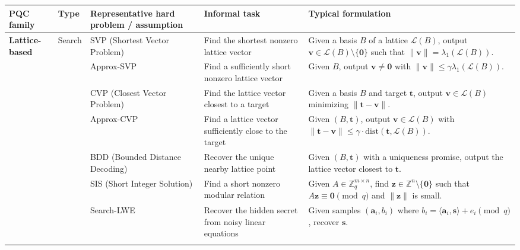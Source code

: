 \documentclass[11pt]{article}
\begin{document}
	\begin{center}
		\scriptsize
		\renewcommand{\arraystretch}{1.35}
		\setlength{\tabcolsep}{4pt}
		\begin{tabular}{|p{2.1cm}|p{1.8cm}|p{3.3cm}|p{3.8cm}|p{4.9cm}|}
			\hline
			\textbf{PQC family} & \textbf{Type} & \textbf{Representative hard problem / assumption} & \textbf{Informal task} & \textbf{Typical formulation} \\
			\hline
			
			\multirow{12}{=}{\textbf{Lattice-based}}
			& \multirow{7}{=}{Search}
			& SVP (Shortest Vector Problem)
			& Find the shortest nonzero lattice vector
			& Given a basis $B$ of a lattice $\mathcal{L}(B)$, output $\bm v \in \mathcal{L}(B)\setminus\{\bm 0\}$ such that $\|\bm v\|=\lambda_1(\mathcal{L}(B))$. \\
			\cline{3-5}
			
			& & Approx-SVP
			& Find a sufficiently short nonzero lattice vector
			& Given $B$, output $\bm v \neq \bm 0$ with $\|\bm v\| \le \gamma \lambda_1(\mathcal{L}(B))$. \\
			\cline{3-5}
			
			& & CVP (Closest Vector Problem)
			& Find the lattice vector closest to a target
			& Given a basis $B$ and target $\bm t$, output $\bm v \in \mathcal{L}(B)$ minimizing $\|\bm t-\bm v\|$. \\
			\cline{3-5}
			
			& & Approx-CVP
			& Find a lattice vector sufficiently close to the target
			& Given $(B,\bm t)$, output $\bm v \in \mathcal{L}(B)$ with $\|\bm t-\bm v\| \le \gamma \cdot \mathrm{dist}(\bm t,\mathcal{L}(B))$. \\
			\cline{3-5}
			
			& & BDD (Bounded Distance Decoding)
			& Recover the unique nearby lattice point
			& Given $(B,\bm t)$ with a uniqueness promise, output the lattice vector closest to $\bm t$. \\
			\cline{3-5}
			
			& & SIS (Short Integer Solution)
			& Find a short nonzero modular relation
			& Given $A \in \mathbb{Z}_q^{m\times n}$, find $\bm z \in \mathbb{Z}^n\setminus\{\bm 0\}$ such that $A\bm z \equiv \bm 0 \pmod q$ and $\|\bm z\|$ is small. \\
			\cline{3-5}
			
			& & Search-LWE
			& Recover the hidden secret from noisy linear equations
			& Given samples $(\bm a_i,b_i)$ where $b_i=\langle \bm a_i,\bm s\rangle+e_i \pmod q$, recover $\bm s$. \\
			\cline{2-5}
			

\end{tabular}
\end{center}
\end{document}

